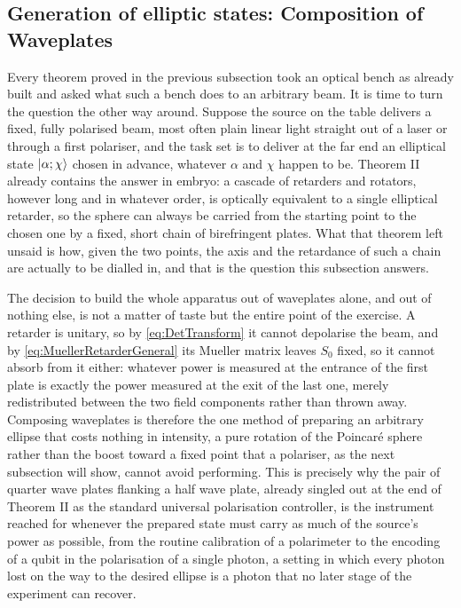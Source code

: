     \subsection{Generation of elliptic states: Composition of Waveplates}

        Every theorem proved in the previous subsection took an optical bench as already built and asked what such a bench does to an arbitrary beam. It is time to turn the question the other way around. Suppose the source on the table delivers a fixed, fully polarised beam, most often plain linear light straight out of a laser or through a first polariser, and the task set is to deliver at the far end an elliptical state $\ket{\alpha;\chi}$ chosen in advance, whatever $\alpha$ and $\chi$ happen to be. Theorem II already contains the answer in embryo: a cascade of retarders and rotators, however long and in whatever order, is optically equivalent to a single elliptical retarder, so the sphere can always be carried from the starting point to the chosen one by a fixed, short chain of birefringent plates. What that theorem left unsaid is how, given the two points, the axis and the retardance of such a chain are actually to be dialled in, and that is the question this subsection answers.

        The decision to build the whole apparatus out of waveplates alone, and out of nothing else, is not a matter of taste but the entire point of the exercise. A retarder is unitary, so by \ref{eq:DetTransform} it cannot depolarise the beam, and by \ref{eq:MuellerRetarderGeneral} its Mueller matrix leaves $S_0$ fixed, so it cannot absorb from it either: whatever power is measured at the entrance of the first plate is exactly the power measured at the exit of the last one, merely redistributed between the two field components rather than thrown away. Composing waveplates is therefore the one method of preparing an arbitrary ellipse that costs nothing in intensity, a pure rotation of the Poincaré sphere rather than the boost toward a fixed point that a polariser, as the next subsection will show, cannot avoid performing. This is precisely why the pair of quarter wave plates flanking a half wave plate, already singled out at the end of Theorem II as the standard universal polarisation controller, is the instrument reached for whenever the prepared state must carry as much of the source's power as possible, from the routine calibration of a polarimeter to the encoding of a qubit in the polarisation of a single photon, a setting in which every photon lost on the way to the desired ellipse is a photon that no later stage of the experiment can recover.


